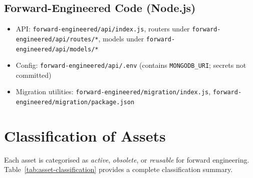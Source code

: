 \subsection*{Forward-Engineered Code (Node.js)}

\begin{itemize}[leftmargin=1.2cm]
  \item API:
        \texttt{forward-engineered/api/index.js},
        routers under \texttt{forward-engineered/api/routes/*},
        models under \texttt{forward-engineered/api/models/*}
  \item Config:
        \texttt{forward-engineered/api/.env}
        (contains \texttt{MONGODB\_URI}; secrets not committed)
  \item Migration utilities:
        \texttt{forward-engineered/migration/index.js},
        \texttt{forward-engineered/migration/package.json}
\end{itemize}

\section{Classification of Assets}

Each asset is categorised as \emph{active}, \emph{obsolete}, or
\emph{reusable} for forward engineering. Table~\ref{tab:asset-classification}
provides a complete classification summary.

